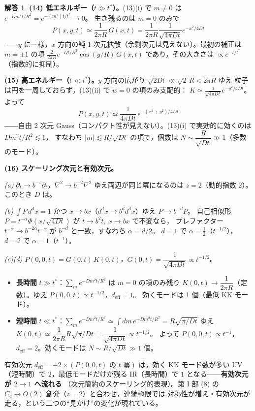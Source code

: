 \documentclass[dvipdfmx, uplatex]{jsarticle}
\theoremstyle{definition}
\newtheorem*{sol}{解答}
\begin{document}
\begin{sol}
\par\smallskip
\textbf{(14) 低エネルギー（$t\gg t^\ast$）。}(13)(i) で $m\neq0$ は $e^{-Dm^2t/R^2}=e^{-(m^2)t/t^\ast}\to0$。
生き残るのは $\boxed{m=0}$ のみで
\[
    \boxed{\,P(x,y,t)\simeq\frac{1}{2\pi R}\,G(x,t)=\frac{1}{2\pi R}\frac{1}{\sqrt{4\pi Dt}}e^{-x^2/4Dt}\,}
\]
――$y$ に一様，$x$ 方向の純 1 次元拡散（余剰次元は見えない）。最初の補正は $m=\pm1$ の項
$\frac{2}{2\pi R}e^{-Dt/R^2}\cos(y/R)\,G(x,t)$ であり，その大きさは $\boxed{\propto e^{-t/t^\ast}}$
（指数的に抑制）。

\par\smallskip
\textbf{(15) 高エネルギー（$t\ll t^\ast$）。}$y$ 方向の広がり $\sqrt{2Dt}\ll\sqrt{2}\,R<2\pi R$ ゆえ
粒子は円を一周しておらず，(13)(ii) で $\boxed{w=0}$ の項のみ支配的：
$K\simeq\frac{1}{\sqrt{4\pi Dt}}e^{-y^2/4Dt}$。よって
\[
    \boxed{\,P(x,y,t)\simeq\frac{1}{4\pi Dt}\,e^{-(x^2+y^2)/4Dt}\,}
\]
――自由 2 次元 Gauss（コンパクト性が見えない）。(13)(i) で実効的に効くのは $Dm^2t/R^2\lesssim1$，
すなわち $|m|\lesssim R/\sqrt{Dt}$ の項で，個数は $\boxed{N\sim\dfrac{R}{\sqrt{Dt}}\gg1}$（多数のモード）。

\par\smallskip
\textbf{(16) スケーリング次元と有効次元。}

\textit{(a)} $\partial_t\to b^{-z}\partial_t$，$\nabla^2\to b^{-2}\nabla^2$ ゆえ両辺が同じ冪になるのは
$\boxed{z=2}$（動的指数 $2$）。このとき $D$ は。

\textit{(b)} $\int P\,d^dx=1$ かつ $x\to bx$（$d^dx\to b^d d^dx$）ゆえ $\boxed{P\to b^{-d}P}$。
自己相似形 $P=t^{-\alpha}\Phi(x/\sqrt{4Dt})$ が $t\to b^2t,\ x\to bx$ で不変なら，
プレファクター $t^{-\alpha}\to b^{-2\alpha}t^{-\alpha}$ が $b^{-d}$ と一致，すなわち $\boxed{\alpha=d/2}$。
$d=1$ で $\alpha=\tfrac12$（$t^{-1/2}$），$d=2$ で $\alpha=1$（$t^{-1}$）。

\textit{(c)(d)} $P(0,0,t)=G(0,t)\,K(0,t)$，$G(0,t)=\dfrac{1}{\sqrt{4\pi Dt}}\propto t^{-1/2}$。
\begin{itemize}
\item[$\bullet$] \textbf{長時間} $t\gg t^\ast$：$\sum_m e^{-Dm^2t/R^2}$ は $\boxed{m=0}$ の項のみ残り
$K(0,t)\to\dfrac{1}{2\pi R}$（定数）。ゆえ $P(0,0,t)\propto\boxed{t^{-1/2}}$，$\boxed{d_{\mathrm{eff}}=1}$。
効くモードは 1 個（最低 KK モード）。
\item[$\bullet$] \textbf{短時間} $t\ll t^\ast$：$\displaystyle\sum_m e^{-Dm^2t/R^2}\simeq\int dm\,e^{-Dm^2t/R^2}
=R\sqrt{\pi/Dt}$ ゆえ $K(0,t)\simeq\dfrac{1}{2\pi R}R\sqrt{\pi/Dt}=\dfrac{1}{\sqrt{4\pi Dt}}\propto t^{-1/2}$。
よって $P(0,0,t)\propto\boxed{t^{-1}}$，$\boxed{d_{\mathrm{eff}}=2}$。効くモードは $N\sim R/\sqrt{Dt}\gg1$ 個。
\end{itemize}
有効次元 $d_{\mathrm{eff}}=-2\times(\text{$P(0,0,t)$ の $t$ 冪})$ は，効く KK モード数が多い UV（短時間）で
$2$，最低モードだけが残る IR（長時間）で $1$ となる――\textbf{有効次元が $2\to1$ へ流れる}
（次元簡約のスケーリング的表現）。第 I 部 (8) の $C_4\to O(2)$ 創発（$z=2$）と合わせ，連続極限では
対称性が増え・有効次元が走る，という二つの``見かけ''の変化が現れている。


\end{sol}
\end{document}
